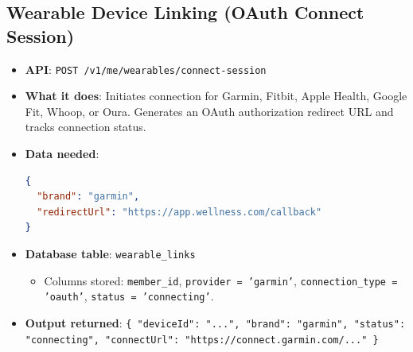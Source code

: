\documentclass[11pt,a4paper]{article}
\begin{document}
\subsection{Wearable Device Linking (OAuth Connect Session)}
\begin{itemize}
    \item \textbf{API}: \texttt{POST /v1/me/wearables/connect-session}
    \item \textbf{What it does}: Initiates connection for Garmin, Fitbit, Apple Health, Google Fit, Whoop, or Oura. Generates an OAuth authorization redirect URL and tracks connection status.
    \item \textbf{Data needed}:
\begin{lstlisting}[language=json]
{
  "brand": "garmin",
  "redirectUrl": "https://app.wellness.com/callback"
}
\end{lstlisting}
    \item \textbf{Database table}: \texttt{wearable\_links}
    \begin{itemize}
        \item Columns stored: \texttt{member\_id}, \texttt{provider = 'garmin'}, \texttt{connection\_type = 'oauth'}, \texttt{status = 'connecting'}.
    \end{itemize}
    \item \textbf{Output returned}: \texttt{\{ "deviceId": "...", "brand": "garmin", "status": "connecting", "connectUrl": "https://connect.garmin.com/..." \}}
\end{itemize}
\end{document}
